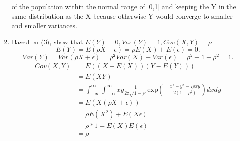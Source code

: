 \documentclass{article}
\begin{document}
\begin{enumerate}
            of the population within the normal range of [0,1] and keeping the Y in the same distribution as the X because otherwise Y would converge to smaller
            and smaller variances.
        \item Based on (3), show that $E(Y) = 0, Var(Y) = 1, Cov(X,Y) = \rho $
            \[
            E(Y) = E(\rho X + \epsilon ) = \rho E(X) + E(\epsilon ) = 0
            .\] 
            \[
            Var(Y) = Var(\rho X + \epsilon ) = \rho ^2Var(X) + Var(\epsilon ) = \rho ^2+1-\rho ^2 = 1
            .\] 
            \begin{align*}
                Cov(X,Y) &= E((X-E(X))(Y-E(Y)))\\
                         &= E(XY)\\ 
                         &= \int_{-\infty}^{\infty}\int_{-\infty}^{\infty}xy \frac{1}{2\pi \sqrt{1-\rho ^2}}\text{exp}(-\frac{x^2+y^2-2\rho xy}{2(1-\rho ^2)})dxdy\\
                         &= E(X(\rho X+\epsilon )) \\
                         &= \rho E(X^2) + E(X\epsilon )\\
                         &= \rho * 1 + E(X)E(\epsilon )\\
                         &= \rho 
            \end{align*}
    \end{enumerate}
\end{document}
